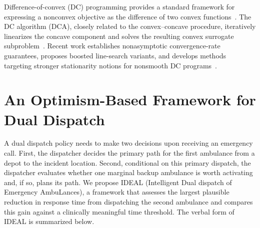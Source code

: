 \documentclass[11pt, letterpaper, oneside, reqno]{amsart}
\begin{document}
Difference-of-convex (DC) programming provides a standard framework for expressing a nonconvex objective as the difference of two convex functions~\cite{ref:tao1997convex, ref:horst1999dc, ref:lethi2018thirty}. 
The DC algorithm (DCA), closely related to the convex--concave procedure, iteratively linearizes the concave component and solves the resulting convex surrogate subproblem~\cite{ref:tao1998dc, ref:lipp2016ccp}. 
Recent work establishes nonasymptotic convergence-rate guarantees, proposes boosted line-search variants, and develops methods targeting stronger stationarity notions for nonsmooth DC programs~\cite{ref:abbaszadehpeivasti2024rate, ref:aragon2018accelerating, ref:pang2017bstationary}.


\section{An Optimism-Based Framework for Dual Dispatch} \label{sec:ideal-framework}
A dual dispatch policy needs to make two decisions upon receiving an emergency call. First, the dispatcher decides the primary path for the first ambulance from a depot to the incident location. Second, conditional on this primary dispatch, the dispatcher evaluates whether one marginal backup ambulance is worth activating and, if so, plans its path. We propose IDEAL (Intelligent Dual dispatch of Emergency AmbuLances), a framework that assesses the largest plausible reduction in response time from dispatching the second ambulance and compares this gain against a clinically meaningful time threshold. The verbal form of IDEAL is summarized below.

\noindent{}
\end{document}

